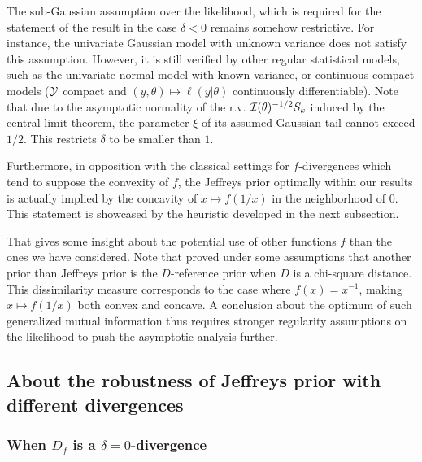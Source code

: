     The sub-Gaussian assumption over the likelihood, which is required for the statement of the result in the case $\delta<0$
    remains somehow restrictive. For instance,
    the univariate Gaussian model with unknown variance does not satisfy this assumption. 
    However, 
    it is still verified by other regular statistical models, such as the
     univariate normal model with known variance, or continuous compact models ($\mathcal{Y}$ compact and $(y,\theta)\mapsto\ell(y|\theta)$ continuously differentiable). {Note that due to the asymptotic normality of the r.v. $\mathcal{I}(\theta)^{-1/2}S_k$ induced by the central limit theorem, the parameter $\xi$ of its assumed Gaussian tail cannot exceed $1/2$. This restricts $\delta$ to be smaller than $1$.}

Furthermore, %
in opposition with the classical settings for $f$-divergences which tend to suppose the convexity of $f$, the Jeffreys prior optimally within our results is actually implied by the concavity of $x\mapsto f(1/x)$ in the neighborhood of $0$.
This statement is showcased by the heuristic developed in the next subsection.

That gives some insight about the potential use of other functions $f$ than the ones we have considered.
Note that \citet{clarke_reference_1997} proved under some assumptions that another prior than Jeffreys prior is the $D$-reference prior when $D$ is a chi-square distance. This dissimilarity measure corresponds to the case where $f(x)=x^{-1}$, making $x\mapsto f(1/x)$ both convex and concave. 
A conclusion about the optimum of such generalized
mutual information thus requires stronger regularity assumptions on the likelihood to push
the asymptotic analysis further. %



    \subsection{About the robustness of Jeffreys prior with different divergences}


        \subsubsection{When $D_f$ is a $\delta=0$-divergence}

